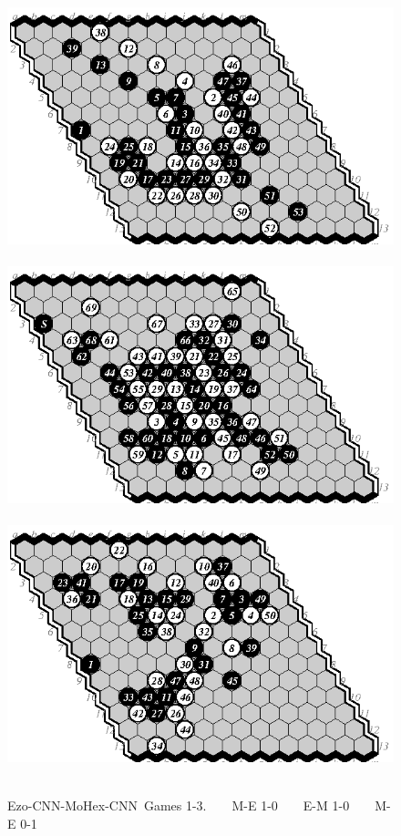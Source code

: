 \documentclass{icga}
\def\Ec{\mbox{\sc Ezo-CNN}}
\def\Mc{\mbox{\sc MoHex-CNN}}
\begin{document}
\begin{figure}[hbp]
\hspace*{-2cm}\
\includegraphics[scale=1]{pix/13.me1.eps}\hspace*{-2cm}\
\includegraphics[scale=1]{pix/13.em2.eps}\hspace*{-2cm}\
\includegraphics[scale=1]{pix/13.me3.eps}\hspace*{-2cm}\
\caption{\Ec{}-\Mc\ Games 1-3. ~ ~ M-E 1-0 ~ ~ E-M 1-0 ~ ~ M-E 0-1}
\end{figure}
\end{document}
